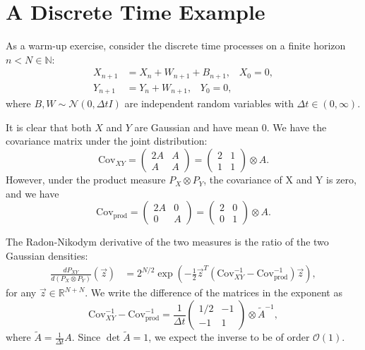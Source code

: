 \documentclass[12pt]{amsart}
\theoremstyle{definition}
\theoremstyle{remark}
\begin{document}
\section{A Discrete Time Example}

As a warm-up exercise, consider the discrete time processes on a finite horizon $n < N\in\mathbb{N}$:
\begin{align}
    \label{eq: signal discrete}
    X_{n+1} &= X_n + W_{n+1} + B_{n+1}, \hspace{10pt} X_0 = 0,\\
    \label{eq: obs discrete}
    Y_{n+1} &= Y_n + W_{n+1},\hspace{10pt} Y_0=0,
\end{align}
where $B, W \sim \mathcal{N}(0,\Delta tI)$ are independent random variables with $\Delta t \in (0,\infty)$.

It is clear that both $X$ and $Y$ are Gaussian and have mean $0$. We have the covariance matrix under the joint distribution:
\begin{equation*}
    \text{Cov}_{XY} = \begin{pmatrix}
        2A&A\\
        A&A
    \end{pmatrix} = \begin{pmatrix}
        2&1\\1&1
    \end{pmatrix}\otimes A.
\end{equation*}
However, under the product measure $P_X\otimes P_Y$, the covariance of X and Y is zero, and we have
\begin{equation*}
    \text{Cov}_{\text{prod}} = \begin{pmatrix}
        2A&0\\
        0&A
    \end{pmatrix} = \begin{pmatrix}
        2&0\\0&1
    \end{pmatrix}\otimes A.
\end{equation*}


The Radon-Nikodym derivative of the two measures is the ratio of the two Gaussian densities:
\begin{align}
    \frac{dP_{XY}}{d(P_X\otimes P_Y)}(\vec{z}) &= 2^{N/2}\exp\left(-\frac{1}{2}\vec{z}^T(\text{Cov}_{XY}^{-1}-\text{Cov}_{\text{prod}}^{-1})\vec{z}\right),
\end{align}
for any $\vec{z}\in \mathbb{R}^{N+N}$. We write the difference of the matrices in the exponent as
\begin{equation*}
    \text{Cov}_{XY}^{-1}-\text{Cov}_{\text{prod}}^{-1} = \frac{1}{\Delta t}\begin{pmatrix}
        1/2&-1\\-1&1
    \end{pmatrix}\otimes \tilde{A}^{-1},
\end{equation*}
where $\tilde{A} = \frac{1}{\Delta t}A$. Since $\det{\tilde{A}} = 1$, we expect the inverse to be of order $\mathcal{O}(1)$.
\end{document}
